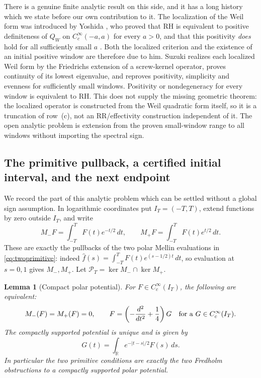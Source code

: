 \documentclass[11pt]{amsart}
\newtheorem{lemma}[theorem]{Lemma}
\theoremstyle{definition}
\theoremstyle{remark}
\newcommand{\RH}{\mathrm{RH}}
\begin{document}
There is a genuine finite analytic result on this side, and it has a long
history which we state before our own contribution to it.  The localization
of the Weil form was introduced by Yoshida \cite{Yoshida1992}, who proved
that $\RH$ is equivalent to positive definiteness of $Q_W$ on
$C_c^\infty(-a,a)$ for every $a>0$, and that this positivity \emph{does}
hold for all sufficiently small $a$ \cite[Lemma~2]{Yoshida1992}.  Both the
localized criterion and the existence of an initial positive window are
therefore due to him.  Suzuki
\cite[Theorems~1.1--1.4]{SuzukiScrew} realizes each localized Weil form by
the Friedrichs extension of a screw-kernel operator, proves continuity of
its lowest eigenvalue, and reproves positivity, simplicity and evenness for
sufficiently small windows.  Positivity or nondegeneracy for every window is
equivalent to $\RH$.  This does not supply the missing geometric theorem:
the localized operator is constructed from the Weil quadratic form itself,
so it is a truncation of row~(c), not an RR/effectivity construction
independent of it.  The open analytic problem is extension from the proven
small-window range to all windows without importing the spectral sign.


\subsection{The primitive pullback, a certified initial interval, and the next endpoint}
\label{subsec:primitiveendpoints}

We record the part of this analytic problem which can be settled without a
global sign assumption.  In logarithmic coordinates put
\(I_T=(-T,T)\), extend functions by zero outside \(I_T\), and write
\[
 M_-F=\int_{-T}^{T}F(t)e^{-t/2}\,dt,
 \qquad
 M_+F=\int_{-T}^{T}F(t)e^{t/2}\,dt .
\]
These are exactly the pullbacks of the two polar Mellin evaluations in
\eqref{eq:twoprimitive}: indeed
\(\widehat f(s)=\int_{-T}^TF(t)e^{(s-1/2)t}\,dt\), so evaluation at
\(s=0,1\) gives \(M_-,M_+\).  Let
\(\mathcal P_T=\ker M_-\cap\ker M_+\).

\begin{lemma}[Compact polar potential]\label{lem:compactpolarpotential}
For \(F\in C_c^\infty(I_T)\), the following are equivalent:
\[
 M_-(F)=M_+(F)=0,
 \qquad
 F=\left(-\frac{d^2}{dt^2}+\frac14\right)G
 \quad\hbox{for a }G\in C_c^\infty(I_T).
\]
The compactly supported potential is unique and is given by
\begin{equation}\label{eq:compactpolarpotential}
 G(t)=\int_{\mathbb R}e^{-|t-s|/2}F(s)\,ds.
\end{equation}
In particular the two primitive conditions are exactly the two Fredholm
obstructions to a compactly supported polar potential.
\end{lemma}
\end{document}
